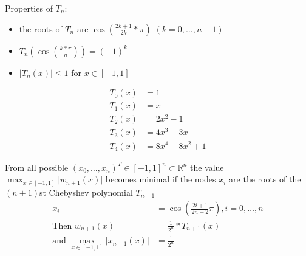 Properties of $T_n$:
\begin{itemize}
    \item the roots of $T_n$ are $\cos(\frac{2k+1}{2k}*\pi)$ $(k=0,\ldots, n-1)$
    \item $T_n\left(\cos(\frac{k*\pi}{n})\right)= (-1)^k$
    \item $\lvert T_n(x) \rvert \leq 1$ for $x \in [-1,1]$
\end{itemize}
\begin{align*}
    T_0(x) &= 1\\
    T_1(x) &= x\\
    T_2(x) &= 2x^2-1\\
    T_3(x) &= 4x^{3}-3x\\
    T_4(x) &= 8x^4-8x^2+1
\end{align*}
\begin{theorem}
    From all possible $(x_0, \ldots, x_n)^T \in [-1,1]^n \subset \mathbb{R}^n$ the value $\max_{x \in [-1,1]} \lvert w_{n+1}(x) \rvert$ becomes minimal if the nodes $x_i$ are
    the roots of the $(n+1)$st Chebyshev polynomial $T_{n+1}$
    \begin{align*}
        x_i &= \cos\left(\frac{2i+1}{2n+2} \pi\right), i=0,\ldots,n\\
        \text{Then } w_{n+1}(x) &= \frac{1}{2^n}* T_{n+1}(x) \\
        \text{and } \max_{x \in [-1,1]} \lvert x_{n+1}(x) \rvert &= \frac{1}{2^n}
    \end{align*}
\end{theorem}

